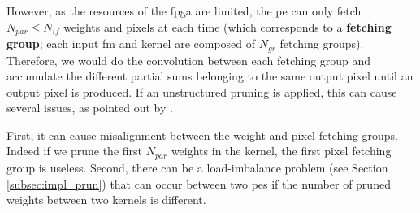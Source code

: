 However, as the resources of the \acrshort{fpga} are limited, the \acrshort{pe} can only fetch $N_{par} \leq N_{if}$ weights and pixels at each time (which corresponds to a \textbf{fetching group}; each input \acrshort{fm} and kernel are composed of $N_{gr}$ fetching groups). Therefore, we would do the convolution between each fetching group and accumulate the different partial sums belonging to the same output pixel until an output pixel is produced. If an unstructured pruning is applied, this can cause several issues, as pointed out by \cite{kang_accelerator-aware_2020}.

First, it can cause misalignment between the weight and pixel fetching groups. Indeed if we prune the first $N_{par}$ weights in the kernel, the first pixel fetching group is useless. Second, there can be a load-imbalance problem (see Section \ref{subsec:impl_prun}) that can occur between two \acrshort{pe}s if the number of pruned weights between two kernels is different. 

